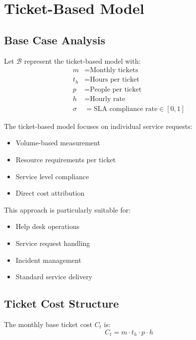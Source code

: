\documentclass[12pt,a4paper]{article}
\newenvironment{definition}[1]
{\begin{mdframed}[style=definitionstyle,frametitle={Definition: #1}]}
{\end{mdframed}}
\newenvironment{explanation}
{\begin{mdframed}[style=explanationstyle,frametitle={Explanation}]}
{\end{mdframed}}
\begin{document}
\section{Ticket-Based Model}
\subsection{Base Case Analysis}
\begin{definition}{Ticket Model Variables}
Let $\mathcal{B}$ represent the ticket-based model with:
\begin{align*}
    m &= \text{Monthly tickets} \\
    t_h &= \text{Hours per ticket} \\
    p &= \text{People per ticket} \\
    h &= \text{Hourly rate} \\
    \sigma &= \text{SLA compliance rate} \in [0,1]
\end{align*}
\end{definition}

\begin{explanation}
The ticket-based model focuses on individual service requests:
\begin{itemize}
    \item Volume-based measurement
    \item Resource requirements per ticket
    \item Service level compliance
    \item Direct cost attribution
\end{itemize}

This approach is particularly suitable for:
\begin{itemize}
    \item Help desk operations
    \item Service request handling
    \item Incident management
    \item Standard service delivery
\end{itemize}
\end{explanation}

\subsection{Ticket Cost Structure}
\begin{definition}{Base Ticket Cost}
The monthly base ticket cost $C_t$ is:
\begin{equation}
    C_t = m \cdot t_h \cdot p \cdot h
\end{equation}
\end{definition}
\end{document}
